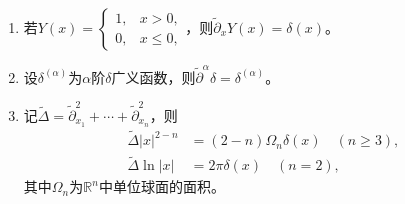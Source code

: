 \documentclass[../../main.tex]{subfiles}%
\begin{document}
\begin{proposition}
\begin{enumerate}[]
\item 若$Y(x)=\begin{cases}1,&x>0,\\0,&x\leqslant0,\end{cases}$，则$\widetilde{\partial}_x Y(x)=\delta(x)$。

\item 设$\delta^{(\alpha)}$为$\alpha$阶$\delta$广义函数，则$\widetilde{\partial}^\alpha\delta=\delta^{(\alpha)}$。

\item 记$\widetilde{\Delta}=\widetilde{\partial}_{x_1}^2+\cdots+\widetilde{\partial}_{x_n}^2$，则
\begin{align*}
\widetilde{\Delta}|x|^{2-n}&=(2-n)\Omega_n\delta(x)\quad(n\geqslant3),\\
\widetilde{\Delta}\ln|x|&=2\pi\delta(x)\quad(n=2),
\end{align*}
其中$\Omega_n$为$\mathbb{R}^n$中单位球面的面积。
\end{enumerate}
\end{proposition}
\end{document}
